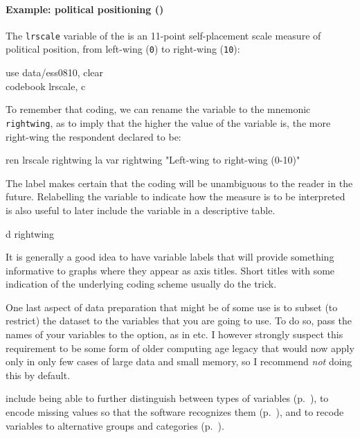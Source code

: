 \begin{mybox}
  \paragraph{Example: political positioning (\ESS)}%
    \label{ess:lrscale}%
  The \texttt{lrscale} variable of the \ess is an 11-point self-placement scale measure of political position, from left-wing (\texttt{0}) to right-wing (\texttt{10}):%
  
	\begin{docspec}
		use data/ess0810, clear\\
    codebook lrscale, c
  \end{docspec}

  To remember that coding, we can rename the variable to the mnemonic \texttt{rightwing}, as to imply that the higher the value of the variable is, the more right-wing the respondent declared to be:%
  
	\begin{docspec}  
		ren lrscale rightwing
		la var rightwing "Left-wing to right-wing (0-10)"\\
  \end{docspec}

  The label makes certain that the coding will be unambiguous to the reader in the future. Relabelling the variable to indicate how the measure is to be interpreted is also useful to later include the variable in a descriptive table.%
  
	\begin{docspec}
    d rightwing
	\end{docspec}

\end{mybox}

It is generally a good idea to have variable labels that will provide something informative to graphs where they appear as axis titles. Short titles with some indication of the underlying coding scheme usually do the trick.

One last aspect of data preparation that might be of some use is to subset (\ie to restrict) the dataset to the variables that you are going to use. To do so, pass the names of your variables to the  option, as in  etc. I however strongly suspect this requirement to be some form of older computing age legacy that would now apply only in only few cases of large data and small memory, so I recommend \emph{not} doing this by default.

 include being able to further distinguish between types of variables (p.~\pageref{sec:variable-types}), to encode missing values so that the software recognizes them (p.~\pageref{sec:missing-values}), and to recode variables to alternative groups and categories (p.~\pageref{sec:categorical-recodes}).

